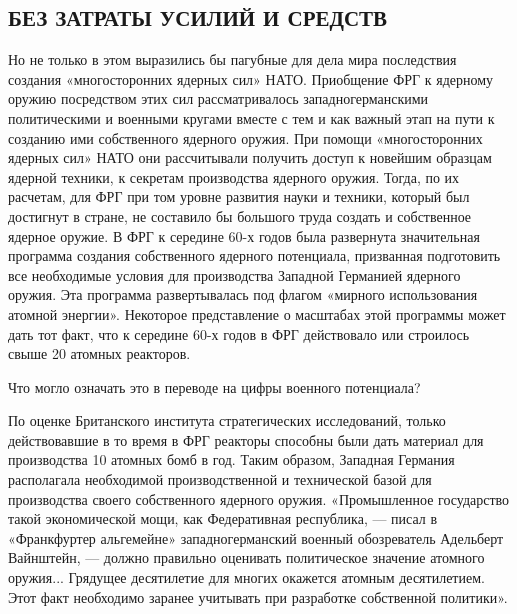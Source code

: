 \documentclass[12pt, a4paper, openany]{book}
\begin{document}
	
		\subsection[Без затраты усилий и средств]{\center БЕЗ ЗАТРАТЫ УСИЛИЙ И СРЕДСТВ}

	
	Но не только в этом выразились бы пагубные для дела мира последствия создания «многосторонних ядерных сил» НАТО. Приобщение ФРГ к ядерному оружию посредством этих сил рассматривалось западногерманскими  политическими и военными кругами вместе с тем и как важный этап на пути к созданию ими собственного ядерного оружия. При  помощи «многосторонних ядерных сил» НАТО они  рассчитывали получить доступ к новейшим образцам ядерной техники, к секретам производства ядерного оружия. Тогда, по их  расчетам, для ФРГ при том уровне развития науки и техники,  который был достигнут в стране, не составило бы большого труда создать и собственное ядерное оружие. В ФРГ к середине 60-х годов была развернута значительная программа создания  собственного ядерного потенциала, призванная подготовить все необходимые условия для производства Западной Германией ядерного оружия. Эта программа развертывалась под флагом «мирного использования атомной энергии». Некоторое  представление о масштабах этой программы может дать тот факт, что к середине 60-х годов в ФРГ действовало или строилось свыше 20 атомных реакторов.
	
	Что могло означать это в переводе на цифры военного  потенциала?
	
	По оценке Британского института стратегических  исследований, только действовавшие в то время в ФРГ реакторы  способны были дать материал для производства 10 атомных бомб в год. Таким образом, Западная Германия располагала  необходимой производственной и технической базой для  производства своего собственного ядерного оружия. «Промышленное государство такой экономической мощи, как Федеративная республика, — писал в «Франкфуртер альгемейне»  западногерманский военный обозреватель Адельберт Вайнштейн, — должно правильно оценивать политическое значение атомного оружия... Грядущее десятилетие для многих окажется  атомным десятилетием. Этот факт необходимо заранее учитывать при разработке собственной политики».
	
	
	
	
	
	
	\newpage
	\tableofcontents
	
	\thispagestyle{empty} %
	
	\newpage
	
	\setcounter{secnumdepth}{0}
	
\end{document}
